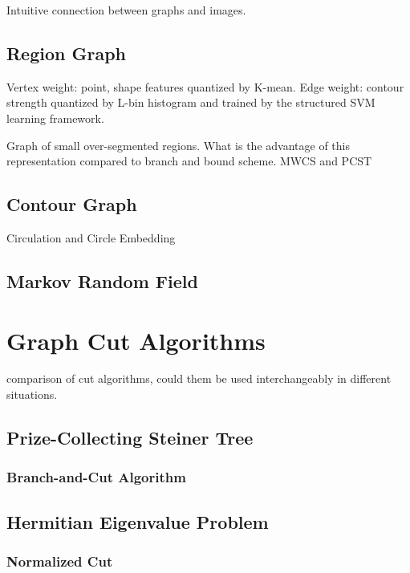 \documentclass{SMBV12}
\begin{document}
Intuitive connection between graphs and images.

\subsection{Region Graph}

\cite{arbelaez2009contours}

Vertex weight: point, shape features quantized by K-mean.
Edge weight: contour strength quantized by L-bin histogram and trained by the structured SVM learning framework.

Graph of small over-segmented regions. What is the advantage of this representation compared to branch and bound scheme. MWCS and PCST

\subsection{Contour Graph}

Circulation and Circle Embedding

\subsection{Markov Random Field}

\section{Graph Cut Algorithms}

comparison of cut algorithms, could them be used interchangeably in different situations.

\subsection{Prize-Collecting Steiner Tree}

\cite{ljubic2006algorithmic}

\subsubsection{Branch-and-Cut Algorithm}

\subsection{Hermitian Eigenvalue Problem}

\subsubsection{Normalized Cut}
\label{sec:normalized_cut}
\end{document}
